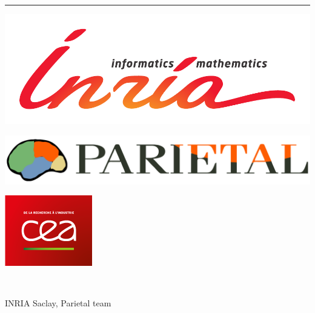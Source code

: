 \documentclass{article}
\begin{document}
\bigskip
\pagestyle{empty}
\vspace*{-3em}
\hrule
    \begin{minipage}{.23\linewidth}
	\hspace*{-2ex}%
	\includegraphics[width=\linewidth]{logo_inria_couleur}
    \end{minipage}%
    \hfill%
    \begin{minipage}{.2\linewidth}
	\includegraphics[width=\linewidth]{logo_parietal}
    \end{minipage}%
    \hfill%
    \begin{minipage}{.15\linewidth}
	\includegraphics[width=\linewidth]{logo_cea}
    \end{minipage}%
    \\
    \begin{minipage}{.6\linewidth}
	\sf
	INRIA Saclay, \qquad\qquad
	Parietal team~
	\small{}
    \end{minipage}
\end{document}
